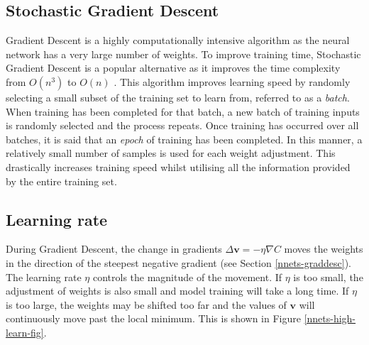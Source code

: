 \subsection*{Stochastic Gradient Descent}\label{nnets-stochgraddesc}

Gradient Descent is a highly computationally intensive algorithm as the neural network has a very large number of weights. To improve training time, Stochastic Gradient Descent is a popular alternative as it improves the time complexity from $O(n^3)$ \citep{Marquardt1963} to $O(n)$ \citep{Robbins1951}. This algorithm improves learning speed by randomly selecting a small subset of the training set to learn from, referred to as a \textit{batch}. When training has been completed for that batch, a new batch of training inputs is randomly selected and the process repeats. Once training has occurred over all batches, it is said that an \textit{epoch} of training has been completed. In this manner, a relatively small number of samples is used for each weight adjustment. This drastically increases training speed whilst utilising all the information provided by the entire training set.

\subsection*{Learning rate}\label{nnets-learningrate}

During Gradient Descent, the change in gradients $\Delta\mathbf{v} = -\eta\nabla C$ moves the weights in the direction of the steepest negative gradient (see Section \ref{nnets-graddesc}). The learning rate $\eta$ controls the magnitude of the movement. If $\eta$ is too small, the adjustment of weights is also small and model training will take a long time. If $\eta$ is too large, the weights may be shifted too far and the values of $\mathbf{v}$ will continuously move past the local minimum. This is shown in Figure \ref{nnets-high-learn-fig}.

